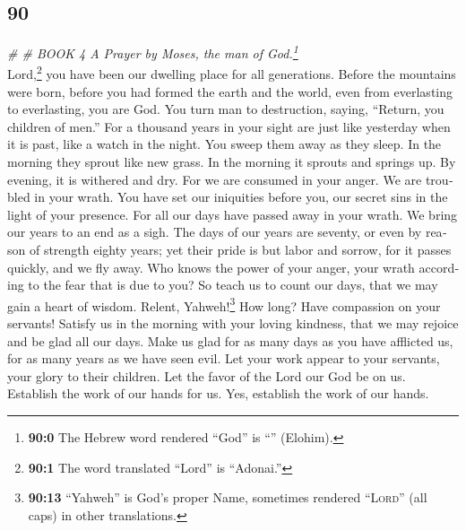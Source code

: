 \begin{paracol}{2}
\switchcolumn
\begin{otherlanguage}{english}

\hypertarget{section-179}{%
\section{90}\label{section-179}}

\emph{\# \# BOOK 4 A Prayer by Moses, the man of God.\footnote{\textbf{90:0}
  The Hebrew word rendered ``God'' is ``'' (Elohim).}}\\
 Lord,\footnote{\textbf{90:1} The word translated ``Lord''
  is ``Adonai.''} you have been our dwelling place for all generations.
 Before the mountains were born, before you had formed the
earth and the world, even from everlasting to everlasting, you are God.
 You turn man to destruction, saying, ``Return, you
children of men.''  For a thousand years in your sight are
just like yesterday when it is past, like a watch in the night.
 You sweep them away as they sleep. In the morning they
sprout like new grass.  In the morning it sprouts and
springs up. By evening, it is withered and dry.  For we
are consumed in your anger. We are troubled in your wrath.
 You have set our iniquities before you, our secret sins
in the light of your presence.  For all our days have
passed away in your wrath. We bring our years to an end as a sigh.
 The days of our years are seventy, or even by reason of
strength eighty years; yet their pride is but labor and sorrow, for it
passes quickly, and we fly away.  Who knows the power of
your anger, your wrath according to the fear that is due to you?
 So teach us to count our days, that we may gain a heart
of wisdom.  Relent, Yahweh!\footnote{\textbf{90:13}
  ``Yahweh'' is God's proper Name, sometimes rendered ``\textsc{Lord}''
  (all caps) in other translations.} How long? Have compassion on your
servants!  Satisfy us in the morning with your loving
kindness, that we may rejoice and be glad all our days. 
Make us glad for as many days as you have afflicted us, for as many
years as we have seen evil.  Let your work appear to your
servants, your glory to their children.  Let the favor of
the Lord our God be on us. Establish the work of our hands for us. Yes,
establish the work of our hands.


\end{otherlanguage}
\end{paracol}
